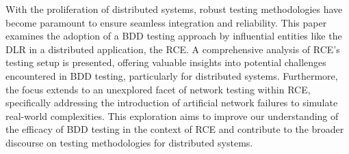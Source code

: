 With the proliferation of distributed systems, robust testing methodologies have become paramount to ensure seamless integration and reliability. This paper examines the adoption of a \ac{BDD} testing approach by influential entities like the \ac{DLR} in a distributed application, the \ac{RCE}. A comprehensive analysis of \ac{RCE}'s testing setup is presented, offering valuable insights into potential challenges encountered in \ac{BDD} testing, particularly for distributed systems. Furthermore, the focus extends to an unexplored facet of network testing within \ac{RCE}, specifically addressing the introduction of artificial network failures to simulate real-world complexities. This exploration aims to improve our understanding of the efficacy of \ac{BDD} testing in the context of \ac{RCE} and contribute to the broader discourse on testing methodologies for distributed systems.